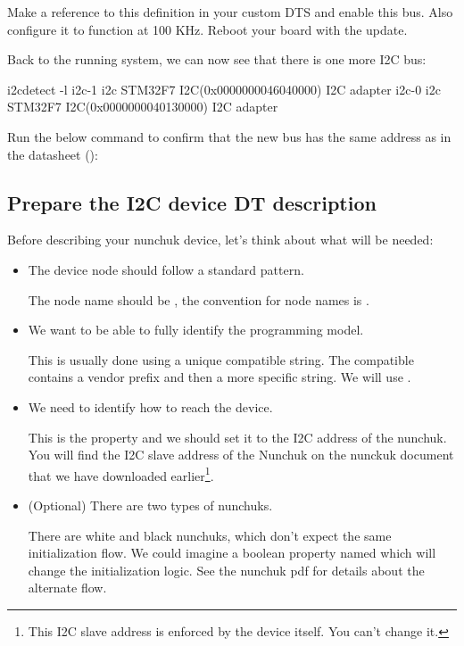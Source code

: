 Make a reference to this definition in your custom DTS and enable this
bus. Also configure it to function at 100 KHz. Reboot your board with
the update.

Back to the running system, we can now see that there is one more
I2C bus:

\begin{bashinput}
 i2cdetect -l
i2c-1	i2c       	STM32F7 I2C(0x0000000046040000) 	I2C adapter
i2c-0	i2c       	STM32F7 I2C(0x0000000040130000) 	I2C adapter
\end{bashinput}

Run the below command to confirm that the new bus has the same address
as in the datasheet ():


\subsection{Prepare the I2C device DT description}

Before describing your nunchuk device, let's think about what will be
needed:
\begin{itemize}
\item The device node should follow a standard pattern.

  The node name should be , the convention for node
  names is .

\item We want to be able to fully identify the programming model.

  This is usually done using a unique compatible string. The compatible
  contains a vendor prefix and then a more specific string. We will use
  .

\item We need to identify how to reach the device.

  This is the  property and we should set it to the I2C
  address of the nunchuk. You will find the I2C slave address of the
  Nunchuk on the nunckuk document that we have downloaded
  earlier\footnote{This I2C slave address is enforced by the device
    itself. You can't change it.}.

\item (Optional) There are two types of nunchuks.

  There are white and black nunchuks, which don't expect the same
  initialization flow. We could imagine a boolean property named
   which will change the initialization
  logic. See the nunchuk pdf for details about the alternate flow.

\end{itemize}

